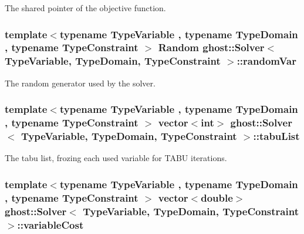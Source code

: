 The shared pointer of the objective function. 

\hypertarget{classghost_1_1Solver_acec87a0a0adcc3a8d794a1ff84718201}{
\subsubsection[{random\-Var}]{\setlength{\rightskip}{0pt plus 5cm}template$<$typename Type\-Variable , typename Type\-Domain , typename Type\-Constraint $>$ {\bf Random} {\bf ghost\-::\-Solver}$<$ Type\-Variable, Type\-Domain, Type\-Constraint $>$\-::random\-Var\hspace{0.3cm}{\ttfamily [private]}}}\label{classghost_1_1Solver_acec87a0a0adcc3a8d794a1ff84718201}


The random generator used by the solver. 

\hypertarget{classghost_1_1Solver_aa5c12894a6fbd524fb33906c8f3fbcae}{
\subsubsection[{tabu\-List}]{\setlength{\rightskip}{0pt plus 5cm}template$<$typename Type\-Variable , typename Type\-Domain , typename Type\-Constraint $>$ vector$<$int$>$ {\bf ghost\-::\-Solver}$<$ Type\-Variable, Type\-Domain, Type\-Constraint $>$\-::tabu\-List\hspace{0.3cm}{\ttfamily [private]}}}\label{classghost_1_1Solver_aa5c12894a6fbd524fb33906c8f3fbcae}


The tabu list, frozing each used variable for T\-A\-B\-U iterations. 

\hypertarget{classghost_1_1Solver_a76c1057367112ead0304b436b5f508f1}{
\subsubsection[{variable\-Cost}]{\setlength{\rightskip}{0pt plus 5cm}template$<$typename Type\-Variable , typename Type\-Domain , typename Type\-Constraint $>$ vector$<$double$>$ {\bf ghost\-::\-Solver}$<$ Type\-Variable, Type\-Domain, Type\-Constraint $>$\-::variable\-Cost\hspace{0.3cm}{\ttfamily [private]}}}\label{classghost_1_1Solver_a76c1057367112ead0304b436b5f508f1}


